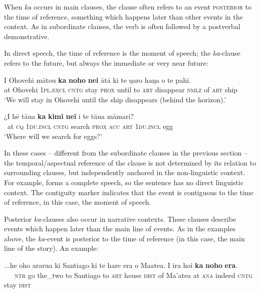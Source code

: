 When \textit{ka} occurs in main clauses, the clause often refers to an event \textsc{posterior} to the time of reference, something which happens later than other events in the context. As in subordinate clauses, the verb is often followed by a postverbal demonstrative.

In direct speech, the time of reference is the moment of speech; the \textit{ka}{}-clause refers to the future, but always the immediate or very near future:

\ea\label{ex:7.49}
\gll {\ꞌ}I {\ꞌ}Ohovehi mātou \textbf{ka} \textbf{noho} \textbf{nei} {\ꞌ}ātā ki te ŋaro haŋa o te pahī. \\
at Ohovehi \textsc{1pl.excl} \textsc{cntg} stay \textsc{prox} until to \textsc{art} disappear \textsc{nmlz} of \textsc{art} ship \\

\glt 
‘We will stay in Ohovehi until the ship disappears (behind the horizon).’ \textstyleExampleref{[R210.083]} 
\z

\ea\label{ex:7.50}
\gll ¿{\ꞌ}I hē tāua \textbf{ka} \textbf{kimi} \textbf{nei} i te tāua māmari? \\
~at \textsc{cq} \textsc{1du.incl} \textsc{cntg} search \textsc{prox} \textsc{acc} \textsc{art} \textsc{1du.incl} egg \\

\glt
‘Where will we search for eggs?’ \textstyleExampleref{[R245.199]} 
\z

In these cases – different from the subordinate clauses in the previous section – the temporal/aspectual reference of the clause is not determined by its relation to surrounding clauses, but independently anchored in the non-linguistic context. For example,  forms a complete speech, so the sentence has no direct linguistic context. The contiguity marker indicates that the event is contiguous to the time of reference, in this case, the moment of speech.

Posterior \textit{ka}{}-clauses also occur in narrative contexts. These clauses describe events which happen later than the main line of events. As in the examples above, the \textit{ka}{}-event is posterior to the time of reference (in this case, the main line of the story). An example:

\ea\label{ex:7.51}
\gll ...he oho ararua ki Santiago ki te hare era o Ma{\ꞌ}atea. {\ꞌ}I ira ho{\ꞌ}i  \textbf{ka} \textbf{noho} \textbf{era}.\\
~~~\textsc{ntr} go the\_two to Santiago to \textsc{art} house \textsc{dist} of Ma’atea at \textsc{ana} indeed  \textsc{cntg} stay \textsc{dist}\\

